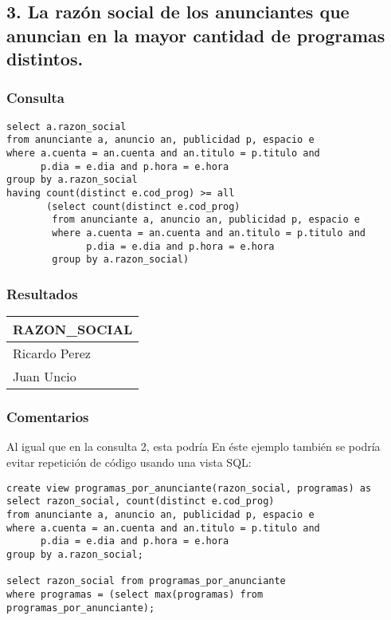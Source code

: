 \subsection*{3. \normalsize{La raz\'on social de los anunciantes que anuncian en la mayor cantidad de programas distintos.}}

\subsubsection*{Consulta}
\begin{lstlisting} 
select a.razon_social
from anunciante a, anuncio an, publicidad p, espacio e
where a.cuenta = an.cuenta and an.titulo = p.titulo and 
      p.dia = e.dia and p.hora = e.hora
group by a.razon_social
having count(distinct e.cod_prog) >= all 
       (select count(distinct e.cod_prog)
        from anunciante a, anuncio an, publicidad p, espacio e
        where a.cuenta = an.cuenta and an.titulo = p.titulo and 
              p.dia = e.dia and p.hora = e.hora
        group by a.razon_social)
\end{lstlisting}

\subsubsection*{Resultados}
\begin{tabular}{|l|}
  \hline
    \bf{RAZON\_SOCIAL} \\ 
  \hline
    Ricardo Perez \\
    Juan Uncio \\ 
  \hline
\end{tabular} 

\subsubsection*{Comentarios}
Al igual que en la consulta 2, esta podr\'ia En \'este ejemplo tambi\'en se podr\'ia evitar repetici\'on de c\'odigo usando una vista SQL:

\begin{lstlisting} 
create view programas_por_anunciante(razon_social, programas) as
select razon_social, count(distinct e.cod_prog)
from anunciante a, anuncio an, publicidad p, espacio e
where a.cuenta = an.cuenta and an.titulo = p.titulo and 
      p.dia = e.dia and p.hora = e.hora
group by a.razon_social;

select razon_social from programas_por_anunciante
where programas = (select max(programas) from programas_por_anunciante);

\end{lstlisting}

